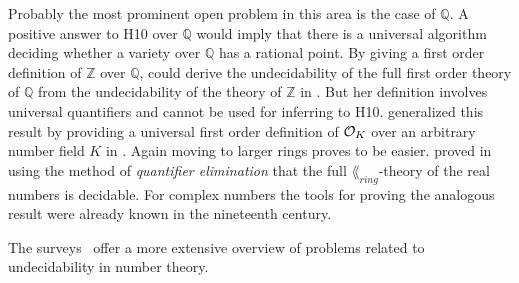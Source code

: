 Probably the most prominent open problem in this area is the case of \(ℚ\). A
positive answer to \textsc{H10} over \(ℚ\) would imply that there is a universal
algorithm deciding whether a variety over \(ℚ\) has a rational point. By giving
a first order definition of \(ℤ\) over \(ℚ\), \textcite{Robinson1949} could
derive the undecidability of the full first order theory of \(ℚ\) from the
undecidability of the theory of \(ℤ\) in \citeyear{Robinson1949}. But her
definition involves universal quantifiers and cannot be used for inferring to
\textsc{H10}. \Textcite{Park2013} generalized this result by providing a
universal first order definition of \(\mathcal{O}_{K}\) over an arbitrary number field
\(K\) in \citeyear{Park2013}. Again moving to larger rings proves to be easier.
\textcite{Tarski1931} proved in \citeyear{Tarski1931} using the method of
\emph{quantifier elimination} that the full \(\lang_{ring}\)-theory of the
real numbers is decidable. For complex numbers the tools for proving the
analogous result were already known in the nineteenth century.

The surveys~\cite{Koenigsmann2014,Poonen2008} offer a more extensive overview of
problems related to undecidability in number theory.
